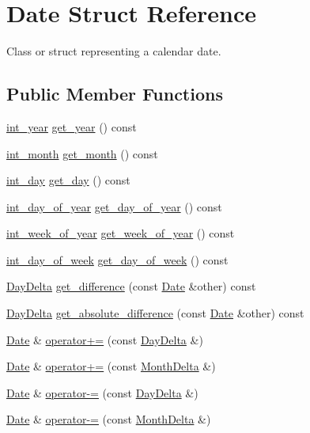 \hypertarget{structDate}{\section{\-Date \-Struct \-Reference}
\label{structDate}
}


\-Class or struct representing a calendar date.  


\subsection*{\-Public \-Member \-Functions}
\begin{DoxyCompactItemize}
\item 
\hyperlink{types_8h_a5b021e50b656f4efcc69340c01a17997}{int\-\_\-year} \hyperlink{structDate_a970cb8375d137e19cea4c042a0b8d64a}{get\-\_\-year} () const 
\item 
\hyperlink{types_8h_ae68f4f515f242b927830881ea4cffae2}{int\-\_\-month} \hyperlink{structDate_afa1025e5868c30b20b1ff1481e30f08d}{get\-\_\-month} () const 
\item 
\hyperlink{types_8h_a5269b564286b0eecff0b944afb81d4e2}{int\-\_\-day} \hyperlink{structDate_a044d6531a4335e3136f7aedd67fc0db0}{get\-\_\-day} () const 
\item 
\hyperlink{types_8h_a3fb1af069c4170879c1a5946cb541c69}{int\-\_\-day\-\_\-of\-\_\-year} \hyperlink{structDate_af19ad4f968f7799a336d2112c784bc9b}{get\-\_\-day\-\_\-of\-\_\-year} () const 
\item 
\hyperlink{types_8h_a893fea48b40c218c9d3edec68cccba83}{int\-\_\-week\-\_\-of\-\_\-year} \hyperlink{structDate_acd84e3844957e82014a2c17bb45bcce3}{get\-\_\-week\-\_\-of\-\_\-year} () const 
\item 
\hyperlink{types_8h_a8132950de7fc3f98373a4d384d8b6eca}{int\-\_\-day\-\_\-of\-\_\-week} \hyperlink{structDate_ad5ff9ecae53c65ba2b45dc4f69f37d5c}{get\-\_\-day\-\_\-of\-\_\-week} () const 
\item 
\hyperlink{structDayDelta}{\-Day\-Delta} \hyperlink{structDate_ae175df5ffb7f12378d41453209994e59}{get\-\_\-difference} (const \hyperlink{structDate}{\-Date} \&other) const 
\item 
\hyperlink{structDayDelta}{\-Day\-Delta} \hyperlink{structDate_a293adccbbf2f42bd54dde9fb0de81f92}{get\-\_\-absolute\-\_\-difference} (const \hyperlink{structDate}{\-Date} \&other) const 
\item 
\hyperlink{structDate}{\-Date} \& \hyperlink{structDate_a0a5674bd1757acf8b229a8448c200bf7}{operator+=} (const \hyperlink{structDayDelta}{\-Day\-Delta} \&)
\item 
\hyperlink{structDate}{\-Date} \& \hyperlink{structDate_ad5a2f681fdc34cbff1511fd7e6dd6f91}{operator+=} (const \hyperlink{structMonthDelta}{\-Month\-Delta} \&)
\item 
\hyperlink{structDate}{\-Date} \& \hyperlink{structDate_a43159e68f1bceedbb169931b85feeee8}{operator-\/=} (const \hyperlink{structDayDelta}{\-Day\-Delta} \&)
\item 
\hyperlink{structDate}{\-Date} \& \hyperlink{structDate_ac7b9e1798bc482f9847d6f87921e4975}{operator-\/=} (const \hyperlink{structMonthDelta}{\-Month\-Delta} \&)
\end{DoxyCompactItemize}

